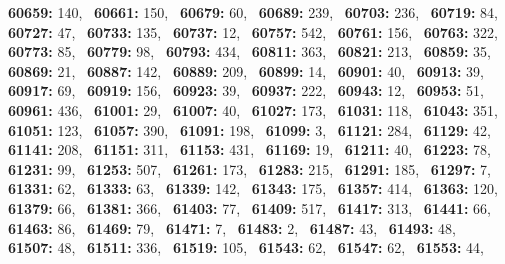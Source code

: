 \textbf{60659:} 140,\allowbreak~ 
\textbf{60661:} 150,\allowbreak~ 
\textbf{60679:} 60,\allowbreak~ 
\textbf{60689:} 239,\allowbreak~ 
\textbf{60703:} 236,\allowbreak~ 
\textbf{60719:} 84,\allowbreak~ 
\textbf{60727:} 47,\allowbreak~ 
\textbf{60733:} 135,\allowbreak~ 
\textbf{60737:} 12,\allowbreak~ 
\textbf{60757:} 542,\allowbreak~ 
\textbf{60761:} 156,\allowbreak~ 
\textbf{60763:} 322,\allowbreak~ 
\textbf{60773:} 85,\allowbreak~ 
\textbf{60779:} 98,\allowbreak~ 
\textbf{60793:} 434,\allowbreak~ 
\textbf{60811:} 363,\allowbreak~ 
\textbf{60821:} 213,\allowbreak~ 
\textbf{60859:} 35,\allowbreak~ 
\textbf{60869:} 21,\allowbreak~ 
\textbf{60887:} 142,\allowbreak~ 
\textbf{60889:} 209,\allowbreak~ 
\textbf{60899:} 14,\allowbreak~ 
\textbf{60901:} 40,\allowbreak~ 
\textbf{60913:} 39,\allowbreak~ 
\textbf{60917:} 69,\allowbreak~ 
\textbf{60919:} 156,\allowbreak~ 
\textbf{60923:} 39,\allowbreak~ 
\textbf{60937:} 222,\allowbreak~ 
\textbf{60943:} 12,\allowbreak~ 
\textbf{60953:} 51,\allowbreak~ 
\textbf{60961:} 436,\allowbreak~ 
\textbf{61001:} 29,\allowbreak~ 
\textbf{61007:} 40,\allowbreak~ 
\textbf{61027:} 173,\allowbreak~ 
\textbf{61031:} 118,\allowbreak~ 
\textbf{61043:} 351,\allowbreak~ 
\textbf{61051:} 123,\allowbreak~ 
\textbf{61057:} 390,\allowbreak~ 
\textbf{61091:} 198,\allowbreak~ 
\textbf{61099:} 3,\allowbreak~ 
\textbf{61121:} 284,\allowbreak~ 
\textbf{61129:} 42,\allowbreak~ 
\textbf{61141:} 208,\allowbreak~ 
\textbf{61151:} 311,\allowbreak~ 
\textbf{61153:} 431,\allowbreak~ 
\textbf{61169:} 19,\allowbreak~ 
\textbf{61211:} 40,\allowbreak~ 
\textbf{61223:} 78,\allowbreak~ 
\textbf{61231:} 99,\allowbreak~ 
\textbf{61253:} 507,\allowbreak~ 
\textbf{61261:} 173,\allowbreak~ 
\textbf{61283:} 215,\allowbreak~ 
\textbf{61291:} 185,\allowbreak~ 
\textbf{61297:} 7,\allowbreak~ 
\textbf{61331:} 62,\allowbreak~ 
\textbf{61333:} 63,\allowbreak~ 
\textbf{61339:} 142,\allowbreak~ 
\textbf{61343:} 175,\allowbreak~ 
\textbf{61357:} 414,\allowbreak~ 
\textbf{61363:} 120,\allowbreak~ 
\textbf{61379:} 66,\allowbreak~ 
\textbf{61381:} 366,\allowbreak~ 
\textbf{61403:} 77,\allowbreak~ 
\textbf{61409:} 517,\allowbreak~ 
\textbf{61417:} 313,\allowbreak~ 
\textbf{61441:} 66,\allowbreak~ 
\textbf{61463:} 86,\allowbreak~ 
\textbf{61469:} 79,\allowbreak~ 
\textbf{61471:} 7,\allowbreak~ 
\textbf{61483:} 2,\allowbreak~ 
\textbf{61487:} 43,\allowbreak~ 
\textbf{61493:} 48,\allowbreak~ 
\textbf{61507:} 48,\allowbreak~ 
\textbf{61511:} 336,\allowbreak~ 
\textbf{61519:} 105,\allowbreak~ 
\textbf{61543:} 62,\allowbreak~ 
\textbf{61547:} 62,\allowbreak~ 
\textbf{61553:} 44,\allowbreak~ 
